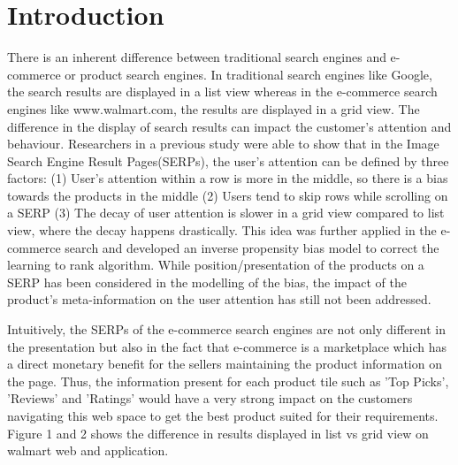 \documentclass[11pt]{article}
\begin{document}
\section{Introduction}
There is an inherent difference between traditional search engines and e-commerce or product search engines. In traditional search engines like Google, the search results are displayed in a list view  whereas in the e-commerce search engines like www.walmart.com, the results are displayed in a grid view. The difference in the display of search results can impact the customer's attention and behaviour. Researchers in a previous study \cite{10.1145/3308558.3313514} were able to show that in the Image Search Engine Result Pages(SERPs), the user's attention can be defined by three factors: (1) User's attention within a row is more in the middle, so there is a bias towards the products in the middle (2) Users tend to skip rows while scrolling on a SERP (3) The decay of user attention is slower in a grid view compared to list view, where the decay happens drastically. This idea was further applied in the e-commerce search \cite{10.1145/3394486.3403336} and developed an inverse propensity bias model to correct the learning to rank algorithm. While position/presentation of the products on a SERP has been considered in the modelling of the bias, the impact of the product's meta-information on the user attention has still not been addressed. 

Intuitively, the SERPs of the e-commerce search engines are not only different in the presentation but also in the fact that e-commerce is a marketplace which has a direct monetary benefit for the sellers maintaining the product information on the page. Thus, the information present for each product tile such as 'Top Picks', 'Reviews' and 'Ratings' would have a very strong impact on the customers navigating this web space to get the best product suited for their requirements. Figure 1 and 2 shows the difference in results displayed in list vs grid view on walmart web and application.
\end{document}
